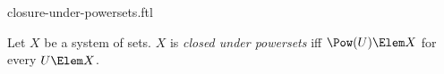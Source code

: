 \documentclass{stex}
\begin{document}
\begin{smodule}{closure-under-powersets.ftl}



\begin{definition*}[forthel,for=closed under powersets]
  Let $X$ be a system of sets.
  $X$ is \emph{closed under powersets} iff $\Pow(U) \Elem X$ for every $U \Elem X$.
\end{definition*}

\end{smodule}
\end{document}
